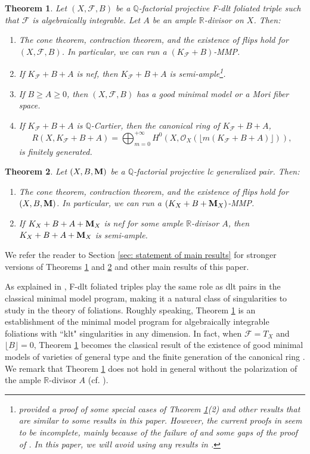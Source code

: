 \documentclass[11pt]{amsart}
\numberwithin{equation}{section}
\newcommand{\Mm}{{\bf{M}}}
\newcommand{\Qq}{\mathbb{Q}}
\newcommand{\Rr}{\mathbb{R}}
\newcommand{\Ff}{\mathcal{F}}
\newtheorem{alphthm}{Theorem}
\theoremstyle{definition}
\theoremstyle{definition}
\theoremstyle{definition}
\begin{document}
\begin{alphthm}\label{thm: main mmp foliation}
Let $(X,\Ff,B)$ be a $\Qq$-factorial projective F-dlt foliated triple such that $\Ff$ is algebraically integrable. Let $A$ be an ample $\Rr$-divisor on $X$. Then:
\begin{enumerate}
    \item The cone theorem, contraction theorem, and the existence of flips hold for $(X,\Ff,B)$. In particular, we can run a $(K_\Ff+B)$-MMP.
    \item  If $K_{\Ff}+B+A$ is nef, then $K_{\Ff}+B+A$ is semi-ample\footnote{\cite[Theorem 1.2]{CD23} provided a proof of some special cases of Theorem \ref{thm: main mmp foliation}(2) and other results that are similar to some results in this paper. However, the current proofs in \cite{CD23} seem to be incomplete, mainly because of the failure of \cite[Lemma 2.4]{CD23} and some gaps of the proof of \cite[Theorem 3.5]{CD23}. In this paper, we will avoid using any results in \cite{CD23}.}.
    \item If $B\geq A\geq 0$, then $(X,\Ff,B)$ has a good minimal model or a Mori fiber space.
    \item If $K_{\Ff}+B+A$ is $\Qq$-Cartier, then the canonical ring of $K_{\Ff}+B+A$,
    $$R(X,K_{\Ff}+B+A)=\bigoplus_{m=0}^{+\infty}H^0(X,\mathcal{O}_X(\lfloor m(K_{\Ff}+B+A)\rfloor)),$$
    is finitely generated.
\end{enumerate}
\end{alphthm}


\begin{alphthm}\label{thm: main mmp gpair}
Let $(X,B,\Mm)$ be a $\Qq$-factorial projective lc generalized pair. Then:
\begin{enumerate}
    \item The cone theorem, contraction theorem, and the existence of flips hold for $(X,B,\Mm)$. In particular, we can run a $(K_X+B+\Mm_X)$-MMP.
    \item If $K_X+B+A+\Mm_X$ is nef for some ample $\Rr$-divisor $A$, then $K_X+B+A+\Mm_X$ is semi-ample.
\end{enumerate}
\end{alphthm}

We refer the reader to Section \ref{sec: statement of main results} for stronger versions of Theorems \ref{thm: main mmp foliation} and \ref{thm: main mmp gpair} and other main results of this paper.

As explained in \cite{CS21, SS22}, F-dlt foliated triples play the same role as dlt pairs in the classical minimal model program, making it a natural class of singularities to study in the theory of foliations. Roughly speaking, Theorem \ref{thm: main mmp foliation} is an establishment of the minimal model program for algebraically integrable foliations with ``klt" singularities in any dimension. In fact, when $\Ff=T_X$ and $\lfloor B\rfloor=0$, Theorem \ref{thm: main mmp foliation} becomes the classical result of the existence of good minimal models of varieties of general type and the finite generation of the canonical ring \cite[Theorem 1.2]{BCHM10}. We remark that Theorem \ref{thm: main mmp foliation} does not hold in general without the polarization of the ample $\Rr$-divisor $A$ (cf. \cite[Example 5.4]{ACSS21}). 
\end{document}
